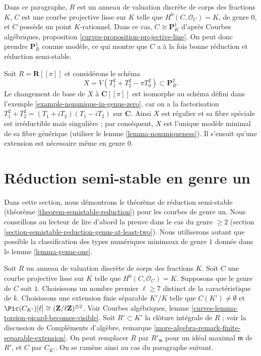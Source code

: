 \medskip\noindent
Dans ce paragraphe, $R$ est un anneau de valuation discrète de corps des
fractions $K$, $C$ est une courbe projective lisse sur $K$ telle que
$H^0(C,\mathcal{O}_C)=K$, de genre $0$, et $C$ possède un point
$K$-rationnel. Dans ce cas, $C\cong\mathbf{P}^1_K$ d'après Courbes
algébriques, proposition \ref{curves-proposition-projective-line}. On peut
donc prendre $\mathbf{P}^1_R$ comme modèle, ce qui montre que $C$ a à la
fois bonne réduction et réduction semi-stable.

\begin{example}
\label{example-extension-necessary-genus-zero}
Soit $R=\mathbf{R}[[\pi]]$ et considérons le schéma
$$
X = V(T_1^2 + T_2^2 - \pi T_0^2) \subset \mathbf{P}^2_R.
$$
Le changement de base de $X$ à $\mathbf{C}[[\pi]]$ est isomorphe au schéma
défini dans l'exemple \ref{example-nonunique-in-genus-zero}, car on a la
factorisation $T_1^2+T_2^2=(T_1+iT_2)(T_1-iT_2)$ sur $\mathbf{C}$.
Ainsi $X$ est régulier et sa fibre spéciale est irréductible mais
singulière ; par conséquent, $X$ est l'unique modèle minimal de sa fibre
générique (utiliser le lemme \ref{lemma-nonuniqueness}). Il s'ensuit qu'une
extension est nécessaire même en genre $0$.
\end{example}



\section{Réduction semi-stable en genre un}
\label{section-semistable-reduction-genus-one}

\noindent
Dans cette section, nous démontrons le théorème de réduction semi-stable
(théorème \ref{theorem-semistable-reduction}) pour les courbes de genre un.
Nous conseillons au lecteur de lire d'abord la preuve dans le cas du genre
$\geq2$ (section \ref{section-semistable-reduction-genus-at-least-two}).
Nous utiliserons autant que possible la classification des types numériques
minimaux de genre $1$ donnée dans le lemme \ref{lemma-genus-one}.

\medskip\noindent
Soit $R$ un anneau de valuation discrète de corps des fractions $K$.
Soit $C$ une courbe projective lisse sur $K$ telle que
$H^0(C,\mathcal{O}_C)=K$. Supposons que le genre de $C$ soit $1$.
Choisissons un nombre premier $\ell\geq7$ distinct de la caractéristique
de $k$. Choisissons une extension finie séparable $K'/K$ telle que
$C(K') \not = \emptyset$ et
$\Pic(C_{K'})[\ell]\cong(\mathbf{Z}/\ell\mathbf{Z})^{\oplus2}$.
Voir Courbes algébriques, lemme
\ref{curves-lemma-torsion-picard-becomes-visible}. Soit $R'\subset K'$ la
clôture intégrale de $R$ ; voir la discussion de Compléments d'algèbre,
remarque \ref{more-algebra-remark-finite-separable-extension}. On peut
remplacer $R$ par $R'_{\mathfrak m}$ pour un idéal maximal $\mathfrak m$
de $R'$, et $C$ par $C_{K'}$. On se ramène ainsi au cas du paragraphe
suivant.

